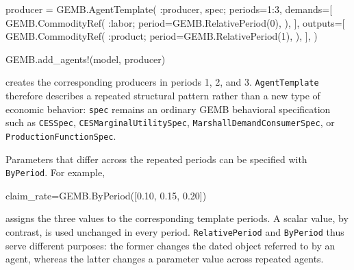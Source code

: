 \documentclass[
  letterpaper,
  DIV=11,
  numbers=noendperiod]{scrreprt}
\newenvironment{Shaded}{\begin{snugshade}}{\end{snugshade}}
\newcommand{\FloatTok}[1]{\textcolor[rgb]{0.68,0.00,0.00}{#1}}
\newcommand{\FunctionTok}[1]{\textcolor[rgb]{0.28,0.35,0.67}{#1}}
\newcommand{\NormalTok}[1]{\textcolor[rgb]{0.00,0.23,0.31}{#1}}
\newcommand{\OperatorTok}[1]{\textcolor[rgb]{0.37,0.37,0.37}{#1}}
\begin{document}
\begin{Shaded}
\begin{Highlighting}[]
\NormalTok{producer }\OperatorTok{=}\NormalTok{ GEMB.}\FunctionTok{AgentTemplate}\NormalTok{(}
    \OperatorTok{:}\NormalTok{producer,}
\NormalTok{    spec;}
\NormalTok{    periods}\OperatorTok{=}\FloatTok{1}\OperatorTok{:}\FloatTok{3}\NormalTok{,}
\NormalTok{    demands}\OperatorTok{=}\NormalTok{[}
\NormalTok{        GEMB.}\FunctionTok{CommodityRef}\NormalTok{(}
            \OperatorTok{:}\NormalTok{labor;}
\NormalTok{            period}\OperatorTok{=}\NormalTok{GEMB.}\FunctionTok{RelativePeriod}\NormalTok{(}\FloatTok{0}\NormalTok{),}
\NormalTok{        ),}
\NormalTok{    ],}
\NormalTok{    outputs}\OperatorTok{=}\NormalTok{[}
\NormalTok{        GEMB.}\FunctionTok{CommodityRef}\NormalTok{(}
            \OperatorTok{:}\NormalTok{product;}
\NormalTok{            period}\OperatorTok{=}\NormalTok{GEMB.}\FunctionTok{RelativePeriod}\NormalTok{(}\FloatTok{1}\NormalTok{),}
\NormalTok{        ),}
\NormalTok{    ],}
\NormalTok{)}

\NormalTok{GEMB.}\FunctionTok{add\_agents!}\NormalTok{(model, producer)}
\end{Highlighting}
\end{Shaded}

creates the corresponding producers in periods 1, 2, and 3.
\texttt{AgentTemplate} therefore describes a repeated structural pattern
rather than a new type of economic behavior: \texttt{spec} remains an
ordinary GEMB behavioral specification such as \texttt{CESSpec},
\texttt{CESMarginalUtilitySpec}, \texttt{MarshallDemandConsumerSpec}, or
\texttt{ProductionFunctionSpec}.

Parameters that differ across the repeated periods can be specified with
\texttt{ByPeriod}. For example,

\begin{Shaded}
\begin{Highlighting}[]
\NormalTok{claim\_rate}\OperatorTok{=}\NormalTok{GEMB.}\FunctionTok{ByPeriod}\NormalTok{([}\FloatTok{0.10}\NormalTok{, }\FloatTok{0.15}\NormalTok{, }\FloatTok{0.20}\NormalTok{])}
\end{Highlighting}
\end{Shaded}

assigns the three values to the corresponding template periods. A scalar
value, by contrast, is used unchanged in every period.
\texttt{RelativePeriod} and \texttt{ByPeriod} thus serve different
purposes: the former changes the dated object referred to by an agent,
whereas the latter changes a parameter value across repeated agents.
\end{document}
